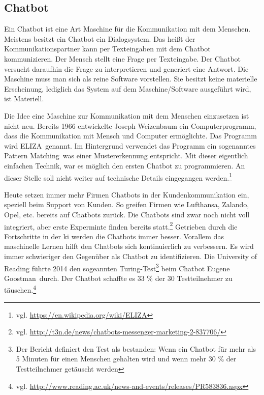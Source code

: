 \subsection{Chatbot}
Ein Chatbot ist eine Art Maschine für die Kommunikation mit dem Menschen. Meistens besitzt ein Chatbot ein Dialogsystem. Das heißt der Kommunikationspartner kann per Texteingaben mit dem Chatbot kommunizieren. Der Mensch stellt eine Frage per Texteingabe. Der Chatbot versucht daraufhin die Frage zu interpretieren und generiert eine Antwort. Die Maschine muss man sich als reine Software vorstellen. Sie besitzt keine materielle Erscheinung, lediglich das System auf dem Maschine/Software ausgeführt wird, ist Materiell.

Die Idee eine Maschine zur Kommunikation mit dem Menschen einzusetzen ist nicht neu. Bereits 1966 entwickelte Joseph Weizenbaum ein Computerprogramm, dass die Kommunikation mit Mensch und Computer ermöglichte. Das Programm wird \glqq ELIZA\grqq\ genannt. Im Hintergrund verwendet das Programm ein sogenanntes \glqq Pattern Matching\grqq\, was einer Mustererkennung entspricht. Mit dieser eigentlich einfachen Technik, war es möglich den ersten Chatbot zu programmieren. An dieser Stelle soll nicht weiter auf technische Details eingegangen werden.\footnote{vgl. \url{https://en.wikipedia.org/wiki/ELIZA}}    

Heute setzen immer mehr Firmen Chatbots in der Kundenkommunikation ein, speziell beim Support von Kunden. So greifen Firmen wie Lufthansa, Zalando, Opel, etc. bereits auf Chatbots zurück. Die Chatbots sind zwar noch nicht voll integriert, aber erste Experminte finden bereits statt.\footnote{vgl. \url{http://t3n.de/news/chatbots-messenger-marketing-2-837706/}} Getrieben durch die Fortschritte in der \ac{ki} werden die Chatbots immer besser. Vorallem das maschinelle Lernen hilft den Chatbots sich kontinuierlich zu verbessern. Es wird immer schwieriger den Gegenüber als Chatbot zu identifizieren. Die University of Reading führte 2014 den sogeannten Turing-Test\footnote{Der Bericht definiert den Test als bestanden: Wenn ein Chatbot für mehr als 5 Minuten für einen Menschen gehalten wird und wenn mehr 30 \% der Testteilnehmer getäuscht werden} beim Chatbot \glqq Eugene Goostman\grqq\ durch. Der Chatbot schaffte es 33 \% der 30 Testteilnehmer zu täuschen.\footnote{vgl. \url{http://www.reading.ac.uk/news-and-events/releases/PR583836.aspx}}

